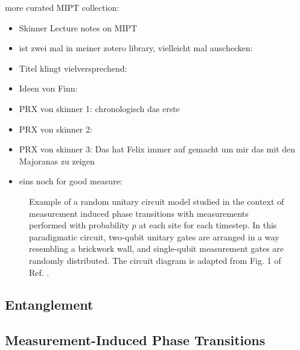 more curated MIPT collection:
\begin{itemize}
  \item Skinner Lecture notes on MIPT
    \cite{skinnerLectureNotesIntroduction2023}
  \item ist zwei mal in meiner zotero library, vielleicht mal auschecken: 
    \cite{hokeMeasurementinducedEntanglementTeleportation2023}
  \item Titel klingt vielversprechend: \cite{baoTheoryPhaseTransition2020}
  \item Ideen von Finn: \cite{joshiObservingQuantumMpemba2024,aresEntanglementAsymmetryProbe2023}
  \item PRX von skinner 1: \cite{skinnerMeasurementInducedPhaseTransitions2019}
    chronologisch das erste
  \item PRX von skinner 2: \cite{nahumMeasurementEntanglementPhase2021}
  \item PRX von skinner 3:
    \cite{nahumEntanglementDynamicsDiffusionannihilation2020}
    Das hat Felix immer auf gemacht um mir das mit den Majoranas zu zeigen
  \item eins noch for good measure:
    \cite{yoshidaDecodingEntanglementStructure2021}
\end{itemize}
%  
\begin{figure}[t]
  \centering
  
  \caption{Example of a random unitary circuit model studied in the context of
    measurement induced phase transitions with measurements
  performed with probability $p$ at each site for each timestep.
  In this paradigmatic
circuit, two-qubit unitary gates are arranged in a way resembling a brickwork
wall, and single-qubit measurement gates are randomly distributed. The circuit
diagram is adapted from Fig. 1 of Ref.
\cite{liMeasurementdrivenEntanglementTransition2019}.}
  \label{fig:hybrid-circuit}
\end{figure}

\subsection{Entanglement}

\subsection{Measurement-Induced Phase Transitions}

